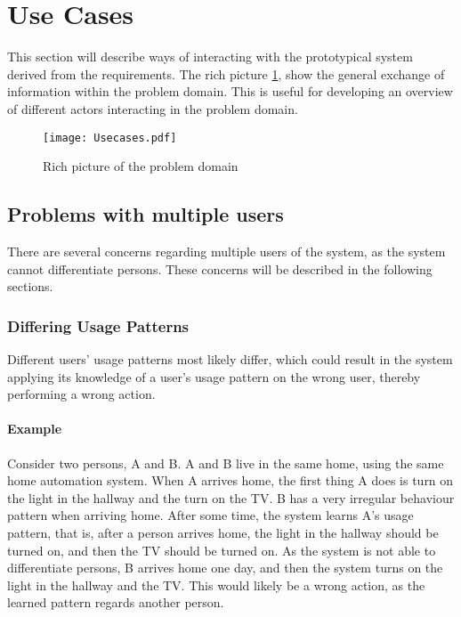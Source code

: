 \section{Use Cases}\label{sub:usecases}

This section will describe ways of interacting with the prototypical system derived from the requirements. The rich picture \cref{fig:richpicture}, show the general exchange of information within the problem domain. This is useful for developing an overview of different actors interacting in the problem domain.

\begin{figure}
  \centering
  \begin{adjustbox}{max width=\textwidth}
    \texttt{[image: Usecases.pdf]}
  \end{adjustbox}
  \caption[Rich picture]{Rich picture of the problem domain}
  \label{fig:richpicture}
\end{figure}

\subsection{Problems with multiple users}\label{sub:multiple_users_problems}
There are several concerns regarding multiple users of the system, as the system cannot differentiate persons. These concerns will be described in the following sections.

\subsubsection{Differing Usage Patterns}
Different users' usage patterns most likely differ, which could result in the system applying its knowledge of a user's usage pattern on the wrong user, thereby performing a wrong action.
\paragraph{Example}
Consider two persons, A and B. A and B live in the same home, using the same home automation system. When A arrives home, the first thing A does is turn on the light in the hallway and the turn on the TV. B has a very irregular behaviour pattern when arriving home. After some time, the system learns A's usage pattern, that is, after a person arrives home, the light in the hallway should be turned on, and then the TV should be turned on. As the system is not able to differentiate persons, B arrives home one day, and then the system turns on the light in the hallway and the TV. This would likely be a wrong action, as the learned pattern regards another person.
